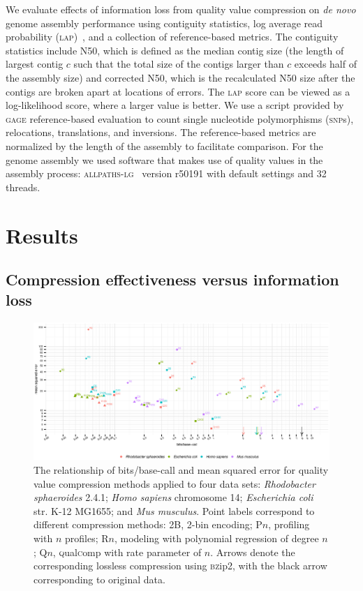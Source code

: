 \documentclass{bioinfo}
\begin{document}
\begin{methods}
We evaluate effects of information loss from quality value compression
on \emph{de novo} genome assembly performance using contiguity
statistics, log average read probability
(\textsc{lap})~\citep{Ghodsi:2013hb}, and a collection of
reference-based metrics. The contiguity statistics include N50, which
is defined as the median contig size (the length of largest contig $c$
such that the total size of the contigs larger than $c$ exceeds half
of the assembly size) and corrected N50, which is the recalculated N50
size after the contigs are broken apart at locations of errors. The
\textsc{lap} score can be viewed as a log-likelihood score, where a
larger value is better. We use a script provided by \textsc{gage}
reference-based evaluation to count single nucleotide polymorphisms
(\textsc{snp}s), relocations, translations, and inversions. The
reference-based metrics are normalized by the length of the assembly
to facilitate comparison. For the genome assembly we used software
that makes use of quality values in the assembly process:
\textsc{allpaths-lg}~\citep{Gnerre:2011kx} version r50191 with default
settings and 32 threads.

\end{methods}

\section{Results}

\subsection{Compression effectiveness versus information loss}

\begin{figure}[!tb]
\centerline{\includegraphics[width=7in]{compression_results.eps}}
\caption{The relationship of bits/base-call and mean squared error for
  quality value compression methods applied to four data sets:
  \textit{Rhodobacter sphaeroides} 2.4.1; \textit{Homo sapiens}
  chromosome 14; \textit{Escherichia coli} str. K-12 MG1655; and
  \textit{Mus musculus}. Point labels correspond to different
  compression methods: 2B, 2-bin encoding; P$n$, profiling with $n$
  profiles; R$n$, modeling with polynomial regression of degree $n$;
  Q$n$, \textsc{q}ual\textsc{c}omp with rate parameter of $n$. Arrows
  denote the corresponding lossless compression using \textsc{bz}ip2,
  with the black arrow corresponding to original data.}
\label{fig:mse_vs_bpbp}
\end{figure}
\end{document}
